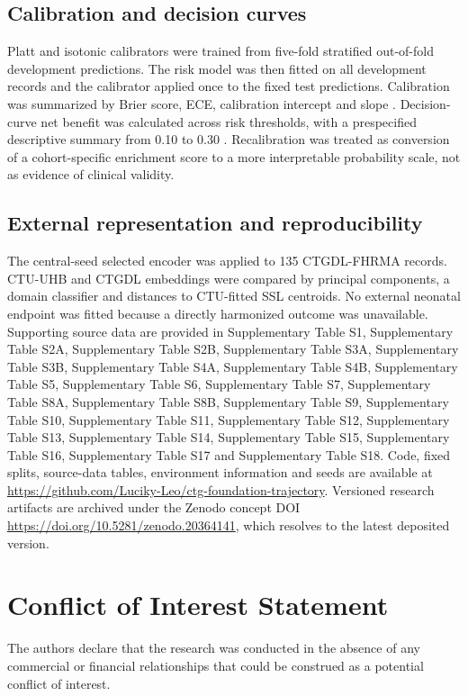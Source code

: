 \documentclass[utf8]{FrontiersinHarvard}
\begin{document}
\subsection{Calibration and decision curves}

Platt and isotonic calibrators were trained from five-fold stratified out-of-fold development predictions. The risk model was then fitted on all development records and the calibrator applied once to the fixed test predictions. Calibration was summarized by Brier score, ECE, calibration intercept and slope \citep{vanCalster2019}. Decision-curve net benefit was calculated across risk thresholds, with a prespecified descriptive summary from 0.10 to 0.30 \citep{vickers2006}. Recalibration was treated as conversion of a cohort-specific enrichment score to a more interpretable probability scale, not as evidence of clinical validity.

\subsection{External representation and reproducibility}

The central-seed selected encoder was applied to 135 CTGDL-FHRMA records. CTU-UHB and CTGDL embeddings were compared by principal components, a domain classifier and distances to CTU-fitted SSL centroids. No external neonatal endpoint was fitted because a directly harmonized outcome was unavailable. Supporting source data are provided in Supplementary Table S1, Supplementary Table S2A, Supplementary Table S2B, Supplementary Table S3A, Supplementary Table S3B, Supplementary Table S4A, Supplementary Table S4B, Supplementary Table S5, Supplementary Table S6, Supplementary Table S7, Supplementary Table S8A, Supplementary Table S8B, Supplementary Table S9, Supplementary Table S10, Supplementary Table S11, Supplementary Table S12, Supplementary Table S13, Supplementary Table S14, Supplementary Table S15, Supplementary Table S16, Supplementary Table S17 and Supplementary Table S18. Code, fixed splits, source-data tables, environment information and seeds are available at \url{https://github.com/Luciky-Leo/ctg-foundation-trajectory}. Versioned research artifacts are archived under the Zenodo concept DOI \url{https://doi.org/10.5281/zenodo.20364141}, which resolves to the latest deposited version.

\section*{Conflict of Interest Statement}
The authors declare that the research was conducted in the absence of any commercial or financial relationships that could be construed as a potential conflict of interest.
\end{document}
